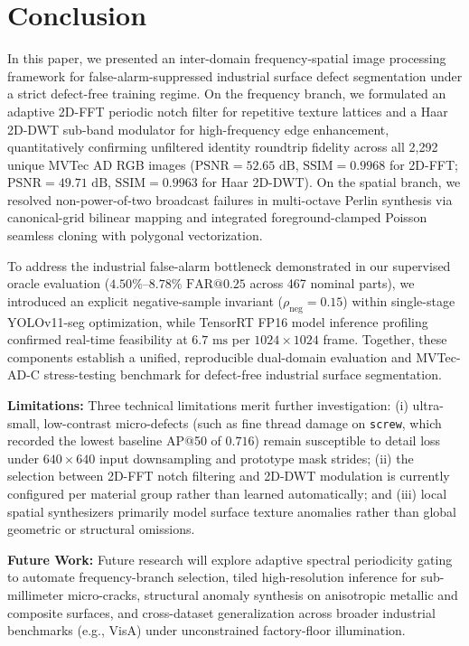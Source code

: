 \section{Conclusion}
\label{sec:conclusion}
In this paper, we presented an inter-domain frequency-spatial image processing framework for false-alarm-suppressed industrial surface defect segmentation under a strict defect-free training regime. On the frequency branch, we formulated an adaptive 2D-FFT periodic notch filter for repetitive texture lattices and a Haar 2D-DWT sub-band modulator for high-frequency edge enhancement, quantitatively confirming unfiltered identity roundtrip fidelity across all 2,292 unique MVTec AD RGB images ($\text{PSNR} = 52.65\text{ dB}$, $\text{SSIM} = 0.9968$ for 2D-FFT; $\text{PSNR} = 49.71\text{ dB}$, $\text{SSIM} = 0.9963$ for Haar 2D-DWT). On the spatial branch, we resolved non-power-of-two broadcast failures in multi-octave Perlin synthesis via canonical-grid bilinear mapping and integrated foreground-clamped Poisson seamless cloning with polygonal vectorization.

To address the industrial false-alarm bottleneck demonstrated in our supervised oracle evaluation ($4.50\%$--$8.78\%$ $\text{FAR@0.25}$ across 467 nominal parts), we introduced an explicit negative-sample invariant ($\rho_{\text{neg}} = 0.15$) within single-stage YOLOv11-seg optimization, while TensorRT FP16 model inference profiling confirmed real-time feasibility at $6.7\text{ ms}$ per $1024 \times 1024$ frame. Together, these components establish a unified, reproducible dual-domain evaluation and MVTec-AD-C stress-testing benchmark for defect-free industrial surface segmentation.

\textbf{Limitations:} Three technical limitations merit further investigation: (i) ultra-small, low-contrast micro-defects (such as fine thread damage on \texttt{screw}, which recorded the lowest baseline AP@50 of $0.716$) remain susceptible to detail loss under $640\times 640$ input downsampling and prototype mask strides; (ii) the selection between 2D-FFT notch filtering and 2D-DWT modulation is currently configured per material group rather than learned automatically; and (iii) local spatial synthesizers primarily model surface texture anomalies rather than global geometric or structural omissions.

\textbf{Future Work:} Future research will explore adaptive spectral periodicity gating to automate frequency-branch selection, tiled high-resolution inference for sub-millimeter micro-cracks, structural anomaly synthesis on anisotropic metallic and composite surfaces, and cross-dataset generalization across broader industrial benchmarks (e.g., VisA) under unconstrained factory-floor illumination.
